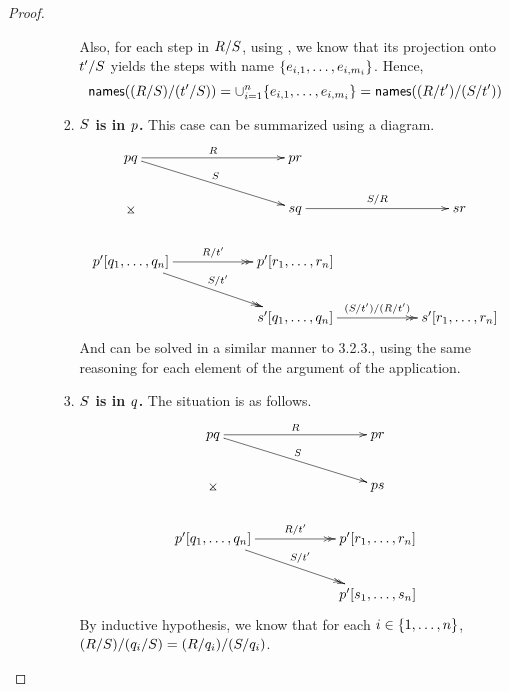 \begin{proof}
\begin{gonzaenv}
\begin{enumerate}
\begin{enumerate}
\begin{enumerate}
            Also, for each step in $R / S$, using , we know that
            its projection onto $t' / S$ yields the steps with name $\{e_{i,1}, \hdots, e_{i, m_i}\}$.
            Hence,
              \[\mathsf{names}((R / S) / (t' / S)) = \cup_{i=1}^n \{e_{i,1}, \hdots, e_{i, m_i}\} = \mathsf{names}((R / t') / (S / t'))\]
          \item {\bf $S$ is in $p$.} This case can be summarized using a diagram.
            \[
            \xymatrix@C=2cm{
              \tmfive \tmsix
                \ar@{->}[r]^{\redex} \ar@{->}[rd]^{\redextwo} \ar@{}[dd]|*=0[@]{\rtimes}
                  & \tmfive \tmfour & \\
                & \tmtwo \tmsix
                  \ar@{->}[r]^{\redextwo / \redex}
                  & \tmtwo \tmfour \\
              \tmfive' [\tmsix_1, \hdots, \tmsix_n]
                \ar@{->>}[r]^{\redex / \tm'} \ar@{->>}[rd]^{\redextwo / \tm'}
                  & \tmfive' [\tmfour_1, \hdots, \tmfour_n] & \\
                  & \tmtwo' [\tmsix_1, \hdots, \tmsix_n]
                    \ar@{->>}[r]^{(\redextwo / \tm') / (\redex / \tm')}
                    & \tmtwo' [\tmfour_1, \hdots, \tmfour_n] \\
              }
            \]
            And can be solved in a similar manner to 3.2.3., using the same reasoning for each element
            of the argument of the application.
          \item {\bf $S$ is in $q$.} The situation is as follows.
            \[
            \xymatrix@C=2cm{
              \tmfive \tmsix
                \ar@{->}[r]^{\redex} \ar@{->}[rd]^{\redextwo} \ar@{}[dd]|*=0[@]{\rtimes}
                  & \tmfive \tmfour \\
                & \tmfive \tmtwo \\
              \tmfive' [\tmsix_1, \hdots, \tmsix_n]
                \ar@{->>}[r]^{\redex / \tm'} \ar@{->>}[rd]^{\redextwo / \tm'}
                  & \tmfive' [\tmfour_1, \hdots, \tmfour_n] \\
                  & \tmfive' [\tmtwo_1, \hdots, \tmtwo_n] \\
              }
            \]
            By inductive hypothesis, we know that for each $i \in \{1, \hdots, n\}$,
            $(R / S) / (q_i / S) = (R / q_i) / (S / q_i)$.


\end{enumerate}
\end{enumerate}
\end{enumerate}
\end{gonzaenv}
\end{proof}
